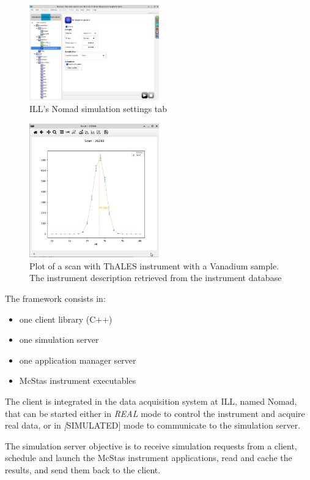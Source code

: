 \documentclass[11pt, a4paper]{article}
\begin{document}
\begin{figure}[htbp]
\includegraphics[width=0.5\textwidth]{figures/McStas-settings.png}
\caption{ILL's Nomad simulation settings tab}
\label{fig:Nomad_sim_settings}
\end{figure}
\begin{figure}[htbp]
\includegraphics[width=0.5\textwidth]{figures/McStas-scan-plot.png}
\caption{Plot of a scan with ThALES instrument with a Vanadium sample. The instrument description retrieved from the instrument database}
\label{fig:Nomad_ThALES_vanadium_scan}
\end{figure}


The framework consists in:
\begin{itemize}
\item one client library (C++)
\item one simulation server
\item one application manager server
\item McStas instrument executables
\end{itemize}

The client is integrated in the data acquisition system at ILL, named Nomad, that can be started either in \emph{REAL} mode to control the instrument and acquire real data, or in \emph[SIMULATED] mode to communicate to the simulation server.

The simulation server objective is to receive simulation requests from a client, schedule and launch the McStas instrument applications, read and cache the results, and send them back to the client.
\end{document}
